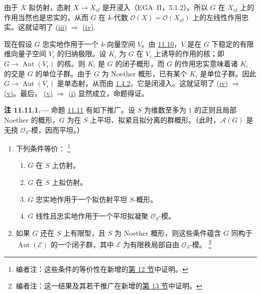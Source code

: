 由于 \(X\) 拟仿射，态射 \(X\to X_{\mathrm{af}}\) 是开浸入\textup{（EGA~II，5.1.2）}。所以 \(G\) 在 \(X_{\mathrm{af}}\) 上的作用当然也是忠实的，从而 \(G\) 在 \(k\)-代数 \(\mathcal O(X)=\mathcal O(X_{\mathrm{af}})\) 上的左线性作用忠实。这就证明了
\hyperref[concl:sga3-VIB-11.11-iii]{\textup{(iii)}}
\(\Rightarrow\)
\hyperref[concl:sga3-VIB-11.11-iv]{\textup{(iv)}}.

现在假设 \(G\) 忠实地作用于一个 \(k\)-向量空间 \(V\)。由 \hyperref[cor:sga3-VIB-11.10]{11.10}，\(V\) 是在 \(G\) 下稳定的有限维向量子空间 \(V_i\) 的归纳极限。设 \(K_i\) 为 \(G\) 在 \(V_i\) 上诱导的作用的核；即 \(G\to\operatorname{Aut}(V_i)\) 的核。则 \(K_i\) 是 \(G\) 的闭子概形，而 \(G\) 的作用忠实意味着诸 \(K_i\) 的交是 \(G\) 的单位子群。由于 \(G\) 为 Noether 概形，已有某个 \(K_i\) 是单位子群。因此 \(G\to\operatorname{Aut}(V_i)\) 是单态射，从而由 \hyperref[cor:sga3-VIB-1.4.2]{1.4.2}，它是闭浸入。这就证明了
\hyperref[concl:sga3-VIB-11.11-iv]{\textup{(iv)}}
\(\Rightarrow\)
\hyperref[concl:sga3-VIB-11.11-v]{\textup{(v)}}。最后，
\hyperref[concl:sga3-VIB-11.11-v]{\textup{(v)}}
\(\Rightarrow\)
\hyperref[concl:sga3-VIB-11.11-i]{\textup{(i)}} 显然成立，命题得证。

\medskip
{}\label{rem:sga3-VIB-11.11.1}%
\noindent\textbf{注 11.11.1.---}
命题 \hyperref[prop:sga3-VIB-11.11]{11.11} 有如下推广。设 \(S\) 为维数至多为 \(1\) 的正则且局部 Noether 的概形，\(G\) 为在 \(S\) 上平坦、拟紧且拟分离的群概形。\textup{（此时，\(\mathcal A(G)\) 是无挠 \(\mathcal O_S\)-模，因而平坦。）}

\begin{enumerate}
\item[\textup{(a)}]\label{concl:sga3-VIB-11.11.1-a}
  下列条件等价：%
  \footnote{\label{note:sga3-VIB-123}编者注：这些条件的等价性在新增的\hyperref[sec:sga3-VIB-12]{第 12 节}中证明。}
  \begin{enumerate}
  \item[\textup{(i)}]\label{concl:sga3-VIB-11.11.1-a-i}
    \(G\) 在 \(S\) 上仿射。
  \item[\textup{(ii)}]\label{concl:sga3-VIB-11.11.1-a-ii}
    \(G\) 在 \(S\) 上拟仿射。
  \item[\textup{(iii)}]\label{concl:sga3-VIB-11.11.1-a-iii}
    \(G\) 忠实地作用于一个拟仿射平坦 \(S\)-概形。
  \item[\textup{(iv)}]\label{concl:sga3-VIB-11.11.1-a-iv}
    \(G\) 线性且忠实地作用于一个平坦拟凝聚 \(\mathcal O_S\)-模。
  \end{enumerate}

\item[\textup{(b)}]\label{concl:sga3-VIB-11.11.1-b}
  如果 \(G\) 还在 \(S\) 上有限型，且 \(S\) 为 Noether 概形，则这些条件蕴含 \(G\) 同构于 \(\operatorname{Aut}(\mathcal E)\) 的一个闭子群，其中 \(\mathcal E\) 为有限秩局部自由 \(\mathcal O_S\)-模。%
  \footnote{\label{note:sga3-VIB-124}编者注：这一结果及其若干推广在新增的\hyperref[sec:sga3-VIB-13]{第 13 节}中证明。}
\end{enumerate}
